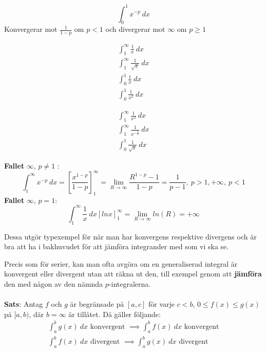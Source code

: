 \documentclass{report}
\begin{document}
\begin{equation*}
	\int_{0}^{1} x^{-p} \: dx 
\end{equation*}
Konvergerar mot $ \frac{1}{1-p}  $ om $ p < 1 $ och divergerar mot $ \infty $ om $ p \ge 1 $ 

{
\begin{align*}
\int_{1}^{ \infty} \frac{1}{x}  \: dx \\
\int_{1}^{ \infty} \frac{1}{ \sqrt{x} }  \: dx \\
\int_{0}^{1} \frac{1}{x}  \: dx \\
\int_{0}^{1} \frac{1}{x^2}  \: dx 
\end{align*}
}

{
\begin{align*}
\int_{1}^{ \infty} \frac{1}{x^2}  \: dx \\
\int_{1}^{ \infty} \frac{1}{x^{- \frac{3}{2} }}  \: dx \\
\int_{0}^{1} \frac{1}{ \sqrt{x} }  \: dx 
\end{align*}
}

\vspace{20pt}
\noindent
\textbf{Fallet} $ \infty $, $ p \ne 1 $ :
\begin{equation*}
	\int_{1}^{ \infty} x^{-p} \: dx = [ \frac{x^{1-p}}{1-p} ]_{1}^{ \infty} = \lim_{R \to \infty} \frac{R^{1-p}-1}{1-p} = \frac{1}{p-1},\: p > 1, + \infty,\: p < 1   
\end{equation*}
\noindent
\textbf{Fallet} $ \infty $, $ p = 1 $:
\begin{equation*}
	\int_{1}^{ \infty} \frac{1}{x}  \: dx [lnx]_{1}^{ \infty} = \lim_{R \to \infty} ln(R) = + \infty
\end{equation*}


\noindent
Dessa utgör typexempel för när man har konvergens respektive divergens och är bra att ha i bakhuvudet för att jämföra integrander med som vi ska se.

\pagebreak
{}
{
Precis som för serier, kan man ofta avgöra om en generaliserad integral är konvergent eller divergent utan att räkna ut den, till exempel genom att \textbf{jämföra} den med någon av den nämnda $ p $-integralerna.\\\\

\textbf{Sats}: Antag $ f $ och $ g $ är begränsade på $ [a,c] $ för varje $ c < b $, $ 0 \le f(x) \le g(x) $ på $ [a,b) $, där $ b = \infty $ är tillåtet. Då gäller följande:
\begin{align}
\int_{a}^{b} g(x) \: dx \text{ konvergent } \implies \int_{a}^{b} f(x)  \: dx \text{ konvergent} \\
\int_{a}^{b} f(x) \: dx \text{ divergent } \implies \int_{a}^{b} g(x) \: dx \text{ divergent}   
\end{align}
}
\end{document}
